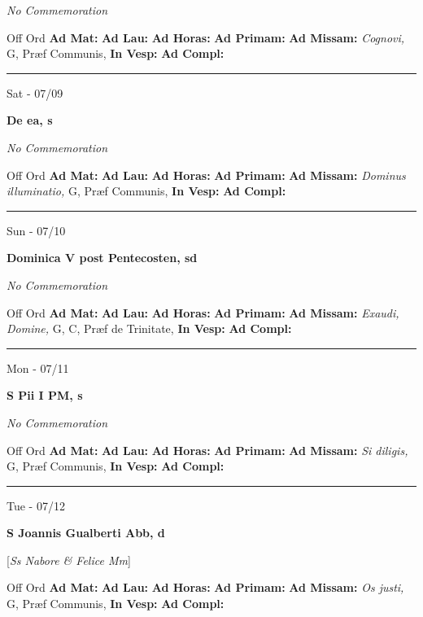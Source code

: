 \documentclass[letterpaper, 10pt]{article}
\begin{document}
\textit{No Commemoration}\begin{justify}
Off Ord
\textbf{Ad Mat: }
\textbf{Ad Lau: }
\textbf{Ad Horas: }
\textbf{Ad Primam: }
\textbf{Ad Missam:} \textit{Cognovi, } G, Præf Communis, 
\textbf{In Vesp: }
\textbf{Ad Compl: }\end{justify}



\hrule
\begin{center}
Sat - 07/09
\end{center}\textbf{ \large De ea, \textnormal{\normalsize s}}

\textit{No Commemoration}\begin{justify}
Off Ord
\textbf{Ad Mat: }
\textbf{Ad Lau: }
\textbf{Ad Horas: }
\textbf{Ad Primam: }
\textbf{Ad Missam:} \textit{Dominus illuminatio, } G, Præf Communis, 
\textbf{In Vesp: }
\textbf{Ad Compl: }\end{justify}



\hrule
\begin{center}
Sun - 07/10
\end{center}\textbf{ \large Dominica V post Pentecosten, \textnormal{\normalsize sd}}

\textit{No Commemoration}\begin{justify}
Off Ord
\textbf{Ad Mat: }
\textbf{Ad Lau: }
\textbf{Ad Horas: }
\textbf{Ad Primam: }
\textbf{Ad Missam:} \textit{Exaudi, Domine, } G, C, Præf de Trinitate, 
\textbf{In Vesp: }
\textbf{Ad Compl: }\end{justify}



\hrule
\begin{center}
Mon - 07/11
\end{center}\textbf{ \large S Pii I PM, \textnormal{\normalsize s}}

\textit{No Commemoration}\begin{justify}
Off Ord
\textbf{Ad Mat: }
\textbf{Ad Lau: }
\textbf{Ad Horas: }
\textbf{Ad Primam: }
\textbf{Ad Missam:} \textit{Si diligis, } G, Præf Communis, 
\textbf{In Vesp: }
\textbf{Ad Compl: }\end{justify}



\hrule
\begin{center}
Tue - 07/12
\end{center}\textbf{ \large S Joannis Gualberti Abb, \textnormal{\normalsize d}}

[\textit{Ss Nabore \& Felice Mm}]
\begin{justify}
Off Ord
\textbf{Ad Mat: }
\textbf{Ad Lau: }
\textbf{Ad Horas: }
\textbf{Ad Primam: }
\textbf{Ad Missam:} \textit{Os justi, } G, Præf Communis, 
\textbf{In Vesp: }
\textbf{Ad Compl: }\end{justify}
\end{document}
